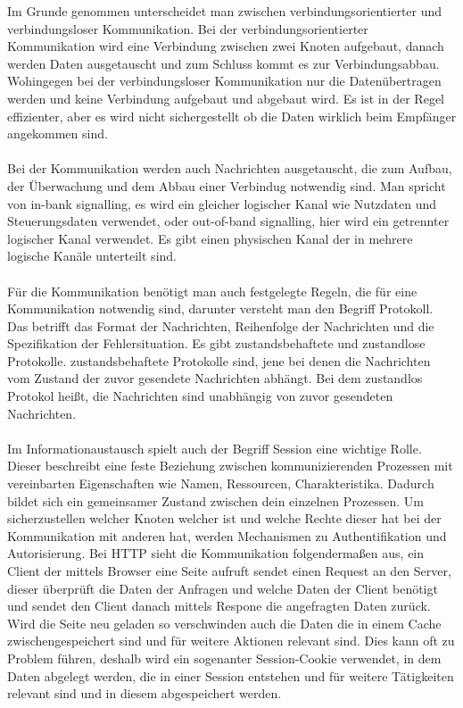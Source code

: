\documentclass[a4paper,12pt]{article}
\begin{document}
Im Grunde genommen unterscheidet man zwischen verbindungsorientierter und verbindungsloser Kommunikation. Bei der verbindungsorientierter Kommunikation wird eine Verbindung zwischen zwei Knoten aufgebaut, danach werden Daten ausgetauscht und zum Schluss kommt es zur
Verbindungsabbau. Wohingegen bei der verbindungsloser Kommunikation nur die Datenübertragen werden und keine Verbindung aufgebaut und abgebaut wird. Es ist in der Regel effizienter, aber es wird nicht sichergestellt ob die Daten wirklich beim Empfänger angekommen sind.\\ \\
Bei der Kommunikation werden auch Nachrichten ausgetauscht, die zum Aufbau, der Überwachung und dem Abbau einer Verbindug notwendig sind. Man spricht von in-bank signalling, es wird ein gleicher logischer Kanal wie Nutzdaten und Steuerungsdaten verwendet, oder out-of-band signalling, hier wird ein getrennter logischer Kanal verwendet. Es gibt einen
physischen Kanal der in mehrere logische Kanäle unterteilt sind. \\ \\
Für die Kommunikation benötigt man auch festgelegte Regeln, die für eine Kommunikation notwendig sind, darunter versteht man den Begriff Protokoll. Das betrifft das Format der Nachrichten, Reihenfolge der Nachrichten und die Spezifikation der Fehlersituation. Es gibt zustandsbehaftete und zustandlose Protokolle. zustandsbehaftete Protokolle sind, jene bei denen die Nachrichten
vom Zustand der zuvor gesendete Nachrichten abhängt. Bei dem zustandlos Protokol heißt, die Nachrichten sind unabhängig von zuvor gesendeten Nachrichten.\\\\
Im Informationaustausch spielt auch der Begriff Session eine wichtige Rolle. Dieser beschreibt eine feste Beziehung zwischen kommunizierenden Prozessen mit vereinbarten Eigenschaften wie Namen, Ressourcen, Charakteristika. Dadurch bildet sich ein gemeinsamer Zustand zwischen dein einzelnen Prozessen. Um sicherzustellen welcher Knoten welcher ist und welche Rechte dieser hat 
bei der Kommunikation mit anderen hat, werden Mechanismen zu Authentifikation und Autorisierung. Bei HTTP sieht die Kommunikation folgendermaßen aus, ein Client der mittels Browser eine Seite aufruft sendet einen Request an den Server, dieser überprüft die Daten der Anfragen und welche Daten der Client benötigt und sendet den Client danach mittels Respone die angefragten Daten zurück.\\
Wird die Seite neu geladen so verschwinden auch die Daten die in einem Cache zwischengespeichert sind und für weitere Aktionen relevant sind. Dies kann oft zu Problem führen, deshalb wird ein sogenanter Session-Cookie verwendet, in dem Daten abgelegt werden, die in einer Session entstehen und für weitere Tätigkeiten relevant sind und in diesem abgespeichert werden.\\ \\
\end{document}
